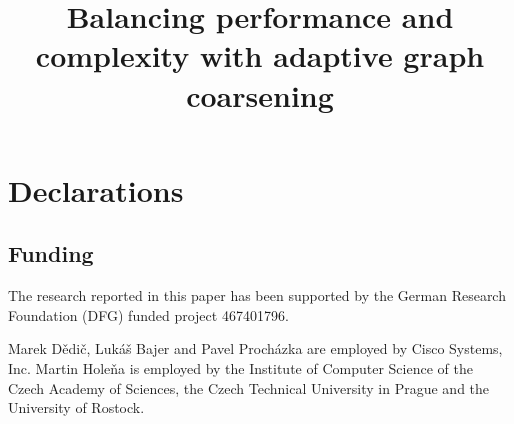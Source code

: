 \documentclass[sn-mathphys,pdflatex,iicol]{sn-jnl}%
\begin{document}
\title[Adaptive graph coarsening]{Balancing performance and complexity with adaptive graph coarsening}

\author*[1,2]{ }

\author[2]{ }

\author[2]{ }
\author[3]{ }






\maketitle









\section*{Declarations}

\subsection*{Funding}

The research reported in this paper has been supported by the German Research Foundation (DFG) funded project 467401796.

Marek Dědič, Lukáš Bajer and Pavel Procházka are employed by Cisco Systems, Inc. Martin Holeňa is employed by the Institute of Computer Science of the Czech Academy of Sciences, the Czech Technical University in Prague and the University of Rostock.
\end{document}
